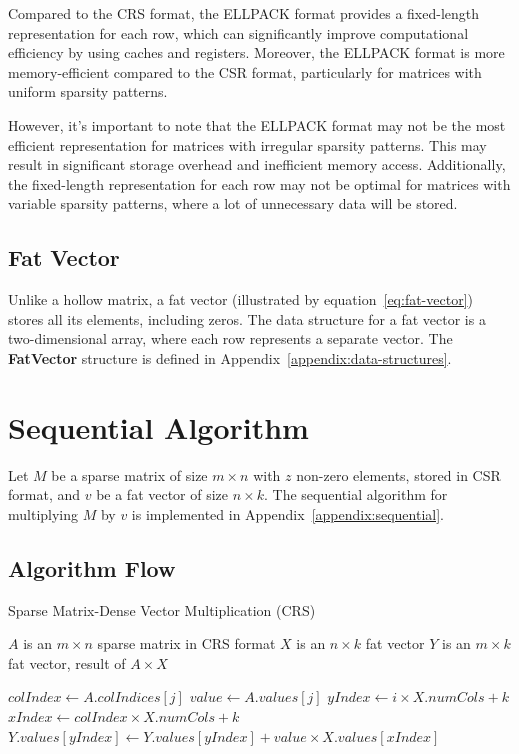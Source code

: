\documentclass[12pt,oneside]{book} %
\begin{document}
Compared to the CRS format, the ELLPACK format provides a fixed-length
representation for each row, which can significantly improve computational
efficiency by using caches and registers. Moreover, the ELLPACK format is more
memory-efficient compared to the CSR format, particularly for matrices with
uniform sparsity patterns.

However, it's important to note that the ELLPACK format may not be the most
efficient representation for matrices with irregular sparsity patterns. This
may result in significant storage overhead and inefficient memory access.
Additionally, the fixed-length representation for each row may not be optimal
for matrices with variable sparsity patterns, where a lot of unnecessary data
will be stored.

\subsection{Fat Vector}
Unlike a hollow matrix, a fat vector (illustrated by
equation~\ref{eq:fat-vector}) stores all its elements, including zeros. The
data structure for a fat vector is a two-dimensional array, where each row
represents a separate vector. The \textbf{FatVector} structure is defined in
Appendix~\ref{appendix:data-structures}.

\newpage
\section{Sequential Algorithm}
Let \( M \) be a sparse matrix of size \( m \times n \) with \( z \) non-zero
elements, stored in CSR format, and \( v \) be a fat vector of size \( n \times
k \). The sequential algorithm for multiplying \( M \) by \( v \) is
implemented in Appendix~\ref{appendix:sequential}.

\subsection{Algorithm Flow}

\begin{algorithm}[H]
    \caption{Sparse Matrix-Dense Vector Multiplication (CRS)}
    \begin{algorithmic}
        \Require $A$ is an $m \times n$ sparse matrix in CRS format
        \Require $X$ is an $n \times k$ fat vector
        \Ensure  $Y$ is an $m \times k$ fat vector, result of $A \times X$

        \State $colIndex \gets A.colIndices[j]$
        \State $value \gets A.values[j]$
        \State $yIndex \gets i \times X.numCols + k$
        \State $xIndex \gets colIndex \times X.numCols + k$
        \State $Y.values[yIndex] \gets Y.values[yIndex] + value \times X.values[xIndex]$
        \EndFor
        \EndFor
        \EndFor
    \end{algorithmic}
\end{algorithm}
\end{document}
